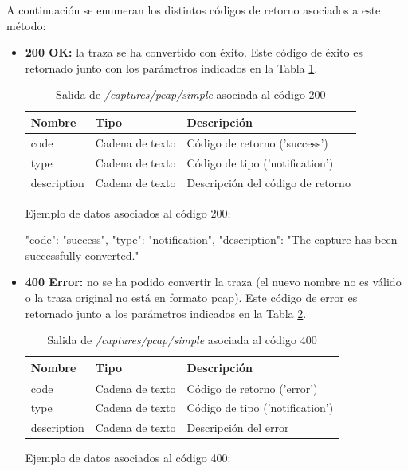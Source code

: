 A continuación se enumeran los distintos códigos de retorno asociados a este método:
\begin{itemize}

\item{\textbf{200 OK:} la \gls{traza} se ha convertido con éxito. Este código de éxito es retornado junto con los parámetros indicados en la Tabla \ref{extra:api:capturespcapsimple:ok}.
\begin{table}[H]
\centering
\begin{tabular}{|l|l|l|}
\hline
\rowcolor[HTML]{F5F5F5}
\textbf{Nombre}  & \textbf{Tipo}   & \textbf{Descripción}              \\ \hline
code             & Cadena de texto & Código de retorno ('success')     \\ \hline
type             & Cadena de texto & Código de tipo ('notification')   \\ \hline
description      & Cadena de texto & Descripción del código de retorno \\ \hline
\end{tabular}
\caption{Salida de \textit{/captures/pcap/simple} asociada al código 200}
\label{extra:api:capturespcapsimple:ok}
\end{table}
\begin{minipage}{\textwidth}
Ejemplo de datos asociados al código 200:

\begin{code}[language=json]
{
  "code": "success",
  "type": "notification",
  "description": "The capture has been successfully converted."
}
\end{code}
\end{minipage}
}

\item{\textbf{400 Error:} no se ha podido convertir la \gls{traza} (el nuevo nombre no es válido o la \gls{traza} original no está en formato \gls{pcap}). Este código de error es retornado junto a los parámetros indicados en la Tabla \ref{extra:api:capturespcapsimple:error}.
\begin{table}[H]
\centering
\begin{tabular}{|l|l|l|}
\hline
\rowcolor[HTML]{F5F5F5}
\textbf{Nombre}  & \textbf{Tipo}   & \textbf{Descripción}            \\ \hline
code             & Cadena de texto & Código de retorno ('error')     \\ \hline
type             & Cadena de texto & Código de tipo ('notification') \\ \hline
description      & Cadena de texto & Descripción del error           \\ \hline
\end{tabular}
\caption{Salida de \textit{/captures/pcap/simple} asociada al código 400}
\label{extra:api:capturespcapsimple:error}
\end{table}
\begin{minipage}{\textwidth}
Ejemplo de datos asociados al código 400:


\end{minipage}}
\end{itemize}

